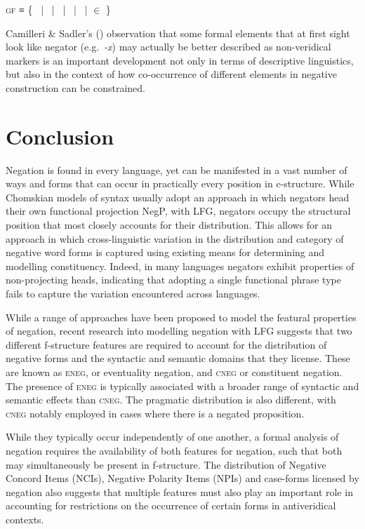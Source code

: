 \documentclass[output=paper,hidelinks]{langscibook}
\begin{document}
\ea
\label{ex:negation:72}
\textsc{gf} ≡ \{ \SUBJ\ | \OBJ\ | \OBJTHETA\ | \OBL\ | \POSS\ |  $\in$ \}

\z 

Camilleri \& Sadler's (\citeyear {camilleri-sadler:2017}) observation that some formal elements that at first sight look like negator (e.g.\ \emph{-x}) may actually be better described as non-veridical markers is an important development not only in terms of descriptive linguistics, but also in the context of how co-occurrence of different elements in negative construction can be constrained.
\normalsize

\section{Conclusion} 
\label{sec:negation:conclusion}

Negation is found in every language, yet can be manifested in a vast number of ways and forms that can occur in practically every position in c-structure. While Chomskian models of syntax usually adopt an approach in which negators head their own functional projection NegP, with LFG, negators occupy the structural position that most closely accounts for their distribution. This allows for an approach in which cross-linguistic variation in the distribution and category of negative word forms is captured using existing means for determining and modelling constituency. Indeed, in many languages negators exhibit properties of non-projecting heads, indicating that adopting a single functional phrase type fails to capture the variation encountered across languages.

While a range of approaches have been proposed to model the featural properties of negation, recent research into modelling negation with LFG suggests that two different f-structure features are required to account for the distribution of negative forms and the syntactic and semantic domains that they license. These are known as \textsc{eneg}, or eventuality negation, and \textsc{cneg} or constituent negation. The presence of \textsc{eneg} is typically associated with a broader range of syntactic and semantic effects than \textsc{cneg}. The pragmatic distribution is also different, with \textsc{cneg} notably employed in cases where there is a negated proposition. 

While they typically occur independently of one another, a formal analysis of negation requires the availability of both features for negation, such that both may simultaneously be present in f-structure. The distribution of Negative Concord Items (NCIs), Negative Polarity Items (NPIs) and case-forms licensed by negation also suggests that multiple features must also play an important role in accounting for restrictions on the occurrence of certain forms in antiveridical contexts.
\end{document}
